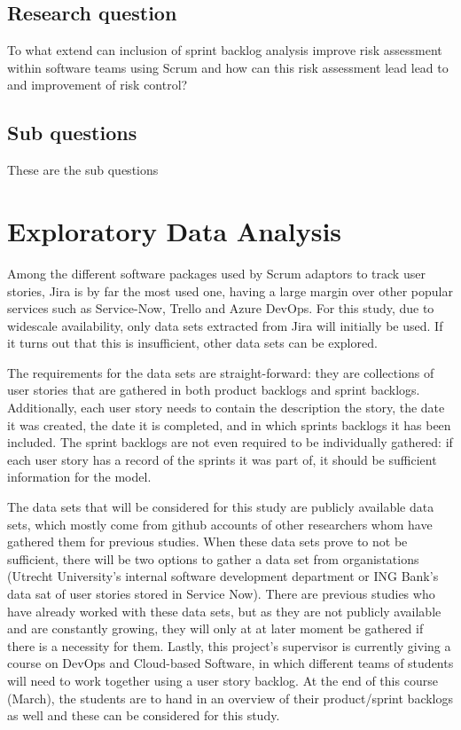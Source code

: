 \documentclass[sigconf]{acmart}
\begin{document}
\subsection{Research question}
To what extend can inclusion of sprint backlog analysis improve risk assessment within software teams using Scrum and how can this risk assessment lead lead to and improvement of risk control?

\subsection{Sub questions}
These are the sub questions

\section{Exploratory Data Analysis}
Among the different software packages used by Scrum adaptors to track user stories, Jira is by far the most used one, having a large margin over other popular services such as Service-Now, Trello and Azure DevOps.
For this study, due to widescale availability, only data sets extracted from Jira will initially be used. If it turns out that this is insufficient, other data sets can be explored.

The requirements for the data sets are straight-forward: they are collections of user stories that are gathered in both product backlogs and sprint backlogs. Additionally, each user story needs to contain the description the story, the date it was created, the date it is completed, and in which sprints backlogs it has been included.
The sprint backlogs are not even required to be individually gathered: if each user story has a record of the sprints it was part of, it should be sufficient information for the model.

The data sets that will be considered for this study are publicly available data sets, which mostly come from github accounts of other researchers whom have gathered them for previous studies. 
When these data sets prove to not be sufficient, there will be two options to gather a data set from organistations (Utrecht University's internal software development department or ING Bank's data sat of user stories stored in Service Now).
There are previous studies who have already worked with these data sets, but as they are not publicly available and are constantly growing, they will only at at later moment be gathered if there is a necessity for them.
Lastly, this project's supervisor is currently giving a course on DevOps and Cloud-based Software, in which different teams of students will need to work together using a user story backlog. At the end of this course (March), the students are to hand in an overview of their product/sprint backlogs as well and these can be considered for this study.
\end{document}
